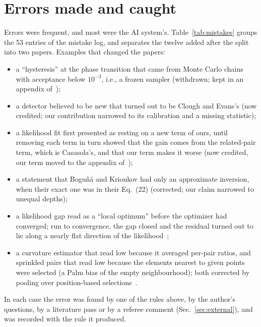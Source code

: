 \documentclass[11pt,a4paper]{article}
\begin{document}
\section{Errors made and caught}
Errors were frequent, and most were the AI system's. Table~\ref{tab:mistakes} groups the 53 entries of the mistake log, and separates the twelve added after the split into two papers. Examples that changed the papers:
\begin{itemize}[itemsep=1pt]
\item a ``hysteresis'' at the phase transition that came from Monte Carlo chains with acceptance below $10^{-3}$, i.e., a frozen sampler (withdrawn; kept in an appendix of~\cite{Toolkit});
\item a detector believed to be new that turned out to be Clough and Evans's (now credited; our contribution narrowed to its calibration and a missing statistic);
\item a likelihood fit first presented as resting on a new term of ours, until removing each term in turn showed that the gain comes from the related-pair term, which is Casasola's, and that our term makes it worse (now credited, our term moved to the appendix of~\cite{Embedding});
\item a statement that Bogu\~n\'a and Krioukov had only an approximate inversion, when their exact one was in their Eq.~(22) (corrected; our claim narrowed to unequal depths);
\item a likelihood gap read as a ``local optimum'' before the optimizer had converged; run to convergence, the gap closed and the residual turned out to lie along a nearly flat direction of the likelihood~\cite{Embedding};
\item a curvature estimator that read low because it averaged per-pair ratios, and sprinkled pairs that read low because the elements nearest to given points were selected (a Palm bias of the empty neighbourhood); both corrected by pooling over position-based selections~\cite{Toolkit}.
\end{itemize}
In each case the error was found by one of the rules above, by the author's questions, by a literature pass or by a referee comment (Sec.~\ref{sec:external}), and was recorded with the rule it produced.
\end{document}
